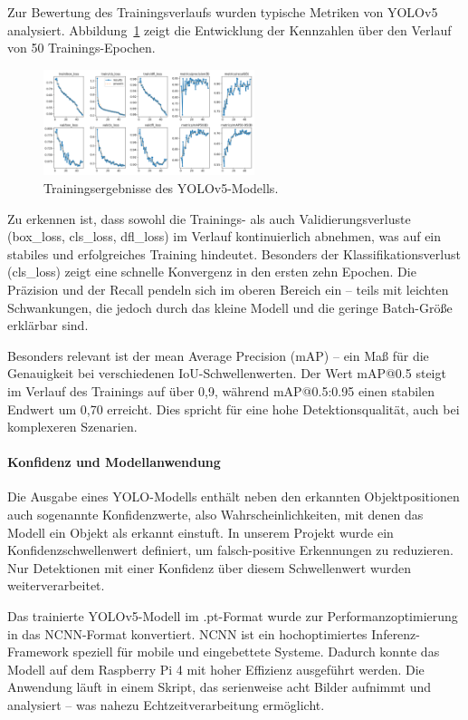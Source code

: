 Zur Bewertung des Trainingsverlaufs wurden typische Metriken von YOLOv5 analysiert. Abbildung~\ref{fig:training} zeigt die Entwicklung der Kennzahlen über den Verlauf von 50 Trainings-Epochen.\\

\begin{figure}[h]
    \centering
    \includegraphics[width=0.55\textwidth]{data/training_results.png}
    \caption{Trainingsergebnisse des YOLOv5-Modells.}
    \label{fig:training}
\end{figure}

Zu erkennen ist, dass sowohl die Trainings- als auch Validierungsverluste (box\_loss, cls\_loss, dfl\_loss) im Verlauf kontinuierlich abnehmen, was auf ein stabiles und erfolgreiches Training hindeutet. Besonders der Klassifikationsverlust (cls\_loss) zeigt eine schnelle Konvergenz in den ersten zehn Epochen. Die Präzision und der Recall pendeln sich im oberen Bereich ein – teils mit leichten Schwankungen, die jedoch durch das kleine Modell und die geringe Batch-Größe erklärbar sind.\singlespacing

Besonders relevant ist der mean Average Precision (mAP) – ein Maß für die Genauigkeit bei verschiedenen IoU-Schwellenwerten. Der Wert mAP@0.5 steigt im Verlauf des Trainings auf über 0,9, während mAP@0.5:0.95 einen stabilen Endwert um 0,70 erreicht. Dies spricht für eine hohe Detektionsqualität, auch bei komplexeren Szenarien.
\paragraph{Konfidenz und Modellanwendung}
Die Ausgabe eines YOLO-Modells enthält neben den erkannten Objektpositionen auch sogenannte Konfidenzwerte, also Wahrscheinlichkeiten, mit denen das Modell ein Objekt als erkannt einstuft. In unserem Projekt wurde ein Konfidenzschwellenwert definiert, um falsch-positive Erkennungen zu reduzieren. Nur Detektionen mit einer Konfidenz über diesem Schwellenwert wurden weiterverarbeitet.\singlespacing

Das trainierte YOLOv5-Modell im .pt-Format wurde zur Performanzoptimierung in das NCNN-Format konvertiert. NCNN ist ein hochoptimiertes Inferenz-Framework speziell für mobile und eingebettete Systeme. Dadurch konnte das Modell auf dem Raspberry Pi 4 mit hoher Effizienz ausgeführt werden. Die Anwendung läuft in einem Skript, das serienweise acht Bilder aufnimmt und analysiert – was nahezu Echtzeitverarbeitung ermöglicht.

